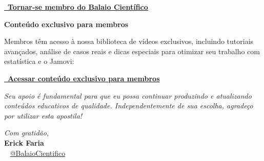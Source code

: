 \begin{center}
\begin{tcolorbox}[
  colback=red!5!white,
  colframe=red!60!black,
  arc=6mm,
  width=10cm,
  halign=center,
  valign=center
]
\href{https://www.youtube.com/channel/UCzHAqwm3RSDM-YKdxd4XYTg/join}{\textcolor{red}{\faYoutube}\ \textbf{Tornar-se membro do Balaio Científico}}
\end{tcolorbox}
\end{center}

\vspace{2mm}
\begin{center}
\textbf{Conteúdo exclusivo para membros}
\end{center}

Membros têm acesso à nossa biblioteca de vídeos exclusivos, incluindo tutoriais avançados, análise de casos reais e dicas especiais para otimizar seu trabalho com estatística e o Jamovi:

\vspace{2mm}
\begin{center}
\begin{tcolorbox}[
  colback=blue!5!white,
  colframe=blue!60!black,
  arc=6mm,
  width=10cm,
  halign=center,
  valign=center
]
\href{https://www.youtube.com/playlist?list=UUMOzHAqwm3RSDM-YKdxd4XYTg}{\textcolor{blue}{\faPlayCircle}\ \textbf{Acessar conteúdo exclusivo para membros}}
\end{tcolorbox}
\end{center}

\vfill

\begin{center}
\emph{Seu apoio é fundamental para que eu possa continuar produzindo e atualizando conteúdos educativos de qualidade. Independentemente de sua escolha, agradeço por utilizar esta apostila!}
\end{center}

\vspace{3mm}
\begin{flushright}
\textit{Com gratidão,}\\
\textbf{Erick Faria}\\
\textcolor{red}{\small\faYoutube}\ \small{ \href{https://www.youtube.com/@BalaioCient%C3%ADfico}{@BalaioCientifico}}
\end{flushright}

\newpage


